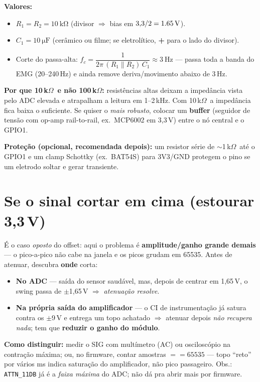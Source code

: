 \documentclass[11pt,a4paper]{article}
\begin{document}
\textbf{Valores:}
\begin{itemize}
  \item $R_1 = R_2 = \SI{10}{\kilo\ohm}$ \;(divisor $\Rightarrow$ bias em
        $3{,}3/2 = \SI{1{,}65}{\volt}$).
  \item $C_1 = \SI{10}{\micro\farad}$ \;(cerâmico ou filme; se eletrolítico,
        \textbf{+} para o lado do divisor).
  \item Corte do passa-alta: $f_c = \dfrac{1}{2\pi\,(R_1\!\parallel\!R_2)\,C_1}
        \approx \SI{3}{\hertz}$ --- passa toda a banda do EMG (20--240\,Hz) e
        ainda remove deriva/movimento abaixo de 3\,Hz.
\end{itemize}

\textbf{Por que 10\,k$\Omega$\ e não 100\,k$\Omega$:} resistências altas
deixam a impedância vista pelo ADC elevada e atrapalham a leitura em 1--2\,kHz.
Com 10\,k$\Omega$\ a impedância fica baixa o suficiente. Se quiser o
\emph{mais robusto}, colocar um \textbf{buffer} (seguidor de tensão com op-amp
rail-to-rail, ex.\ MCP6002 em 3,3\,V) entre o nó central e o GPIO1.

\textbf{Proteção (opcional, recomendada depois):} um resistor série de
$\sim$1\,k$\Omega$\ até o GPIO1 e um clamp Schottky (ex.\ BAT54S) para
3V3/GND protegem o pino se um eletrodo soltar e gerar transiente.

\section{Se o sinal cortar em cima (estourar 3,3\,V)}

É o caso \emph{oposto} do offset: aqui o problema é \textbf{amplitude/ganho
grande demais} --- o pico-a-pico não cabe na janela e os picos grudam em
65535. Antes de atenuar, descubra \textbf{onde} corta:

\begin{itemize}
  \item \textbf{No ADC} --- saída do sensor saudável, mas, depois de centrar em
        1,65\,V, o swing passa de $\pm$1,65\,V $\Rightarrow$ \emph{atenuação resolve}.
  \item \textbf{Na própria saída do amplificador} --- o CI de instrumentação já
        satura contra os $\pm$9\,V e entrega um topo achatado $\Rightarrow$
        atenuar depois \emph{não recupera nada}; tem que \textbf{reduzir o ganho
        do módulo}.
\end{itemize}

\textbf{Como distinguir:} medir o SIG com multímetro (AC) ou osciloscópio na
contração máxima; ou, no firmware, contar amostras $==65535$ --- topo
``reto'' por vários ms indica saturação do amplificador, não pico passageiro.
Obs.: \texttt{ATTN\_11DB} já é a \emph{faixa máxima} do ADC; não dá pra abrir
mais por firmware.
\end{document}
